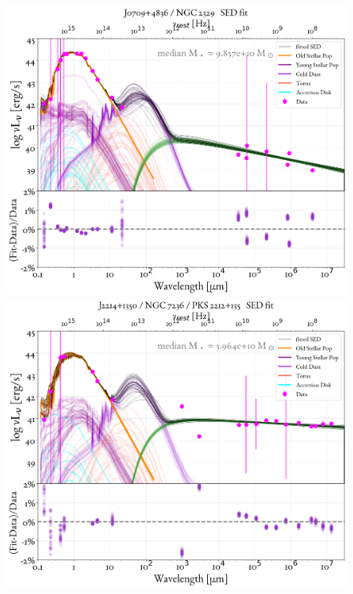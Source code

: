 \begin{figure}
    \centering
    \includegraphics[width=0.85\linewidth]{figures/ResultFits/95_SEDfit_5263.png}\\
    \includegraphics[width=0.85\linewidth]{figures/ResultFits/96_SEDfit_5275.png}   
\end{figure}
